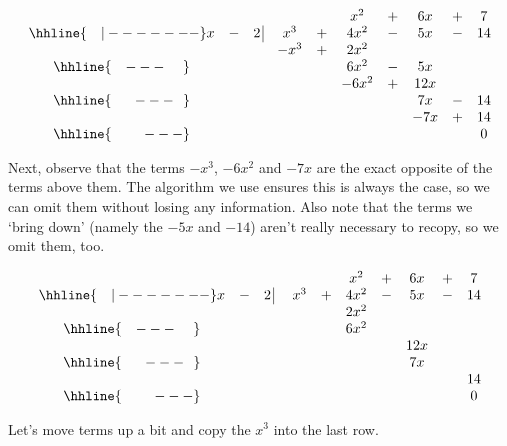 \setlength\arraycolsep{0.1pt}
\setlength\extrarowheight{2pt}

\[ \begin{array}{cccccccccc}
& & & & & x^2 & + & 6x & + & 7 \\ \hhline{~~~|-------}
x & - & 2 \, \vline& x^3 & + & 4x^2 & - & 5x & - & 14 \\
 &  &  &  -x^3  & + &   2x^2 &  &  &  &  \\ \hhline{~~~---~~~~} 
 &  &  &   &  & 6 x^2 & - & 5x &  &  \\ 
 &  &  &   & &-6 x^2  & + &  12x &  &  \\ \hhline{~~~~~---~~} 
 &  &  &   &   &  & & 7x  & - & 14 \\
 &  &  &   &   &  & & - 7x  & + &  14  \\ \hhline{~~~~~~~---} 
 &   &  &  &  &  &  &  &  & 0
\end{array}\]

\setlength\arraycolsep{5pt}
\setlength\extrarowheight{0pt}


Next, observe that the terms $-x^3$, $-6x^2$ and $-7x$ are the exact opposite of the terms above them.  The algorithm we use ensures this is always the case, so we can omit them without losing any information. Also note that the terms we `bring down' (namely the $-5x$ and $-14$) aren't really necessary to recopy, so we omit them, too.


\setlength\arraycolsep{0.1pt}
\setlength\extrarowheight{2pt}

\[ \begin{array}{cccccccccc}
& & & & & x^2 & + & 6x & + & 7 \\ \hhline{~~~|-------}
x & - & 2 \, \vline& \, \, x^3 & + & 4x^2 & - & 5x & - & 14 \\
 &  &  &   &  &   2x^2 &  &  &  &  \\ \hhline{~~~---~~~~} 
 &  &  &   &  & 6 x^2 &  &  &  &  \\ 
 &  &  &   & &  &  &  12x &  &  \\ \hhline{~~~~~---~~} 
 &  &  &   &   &  & & 7x  &  &  \\
 &  &  &   &   &  & &   &  &  14  \\ \hhline{~~~~~~~---} 
 &   &  &  &  &  &  &  &  & 0
\end{array}\]

\setlength\arraycolsep{5pt}
\setlength\extrarowheight{0pt}

Let's move terms up a bit and copy the $x^3$ into the last row.


\setlength\arraycolsep{0.1pt}
\setlength\extrarowheight{2pt}

